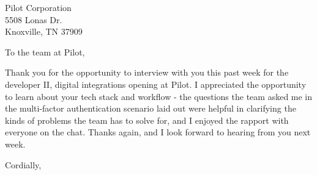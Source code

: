 \documentclass[]{letter}
\newcommand{\companyname}{Pilot Corporation}
\newcommand{\companynameshort}{Pilot}
\newcommand{\position}{developer II, digital integrations}
\newcommand{\companystreetaddress}{5508 Lonas Dr.}
\newcommand{\city}{Knoxville}
\newcommand{\stateshort}{TN}
\newcommand{\zipcode}{37909}
\begin{document}

\begin{letter}{
		\companyname{} \\
		\companystreetaddress{} \\
		\city{}, \stateshort{} \zipcode{}
	}
\address{
	8404 Glaser Ln. \\
	Louisville, KY 40291
}

\opening{To the team at \companynameshort{},}

Thank you for the opportunity to interview with you this past week for the \position{} opening at \companynameshort{}. I appreciated the opportunity to learn about your tech stack and workflow - the questions the team asked me in the multi-factor authentication scenario laid out were helpful in clarifying the kinds of problems the team has to solve for, and I enjoyed the rapport with everyone on the chat. Thanks again, and I look forward to hearing from you next week.


\closing{Cordially,\\
	 \\
}


\end{letter}
\end{document}

